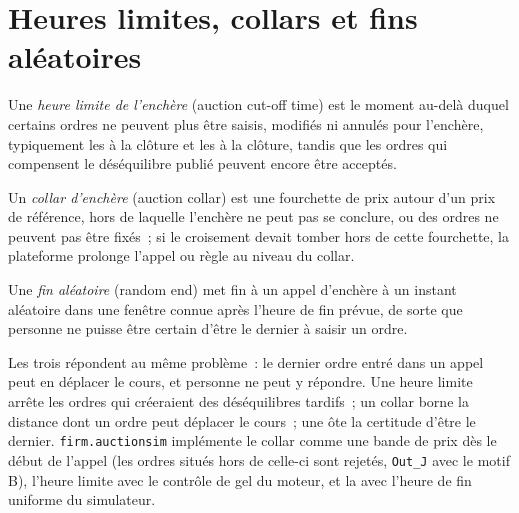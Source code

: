\section{Heures limites, collars et fins aléatoires}

\begin{definition}\label{def:mx:auction-mechanics-and-theory:cutoff}
Une \emph{heure limite de l'enchère} (auction cut-off time) est le moment au-delà duquel certains ordres ne peuvent plus être saisis, modifiés ni annulés pour
l'enchère, typiquement les  à la clôture et les  à la clôture, tandis que les ordres qui compensent le déséquilibre publié peuvent encore être acceptés.
\end{definition}

\begin{definition}\label{def:mx:auction-mechanics-and-theory:collar}
Un \emph{collar d'enchère} (auction collar) est une fourchette de prix autour d'un prix de référence, hors de laquelle l'enchère ne peut pas se conclure, ou des ordres ne peuvent pas être
fixés~; si le croisement devait tomber hors de cette fourchette, la plateforme prolonge l'appel ou règle au niveau du collar.
\end{definition}

\begin{definition}\label{def:mx:auction-mechanics-and-theory:randomend}
Une \emph{fin aléatoire} (random end) met fin à un appel d'enchère à un instant aléatoire dans une fenêtre connue après l'heure de fin prévue, de sorte que personne ne puisse être certain
d'être le dernier à saisir un ordre.
\end{definition}

Les trois répondent au même problème~: le dernier ordre entré dans un appel peut en déplacer le cours, et personne ne peut y répondre. Une heure limite arrête les ordres qui créeraient
des déséquilibres tardifs~; un collar borne la distance dont un ordre peut déplacer le cours~; une  ôte la certitude d'être le dernier. \texttt{firm.auctionsim}
implémente le collar comme une bande de prix dès le début de l'appel (les ordres situés hors de celle-ci sont rejetés, \texttt{Out\_J} avec le motif B), l'heure limite avec le
contrôle de gel du moteur, et la  avec l'heure de fin uniforme du simulateur.

